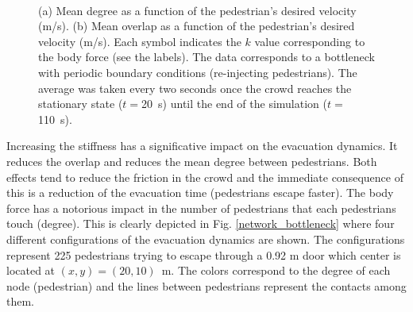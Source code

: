 \documentclass[preprint,12pt]{elsarticle}
\begin{document}
\begin{figure}[!htbp]
\centering
    \ 
    \\
\caption[width=0.47\columnwidth]{(a) Mean degree as a function of the pedestrian’s desired velocity (m/s). (b) Mean overlap as a function of the pedestrian’s desired velocity (m/s). Each symbol indicates the $k$ value corresponding to the body force (see the labels). The data corresponds to a bottleneck with periodic boundary conditions (re-injecting pedestrians). The average was taken every two seconds once the crowd reaches the stationary state ($t=$20~s) until the end of the simulation ($t=$110~s).}
\label{degree_overlap_vd}
\end{figure}


Increasing the stiffness has a significative impact on the evacuation dynamics. It reduces the overlap and reduces the mean degree between pedestrians. Both effects tend to reduce the friction in the crowd and the immediate consequence of this is a reduction of the evacuation time (pedestrians escape faster). The body force has a notorious impact in the number of pedestrians that each pedestrians touch (degree). This is clearly depicted in Fig. \ref{network_bottleneck} where four different configurations of the evacuation dynamics are shown. The configurations represent 225 pedestrians trying to escape through a 0.92 m door which center is located at $(x,y)=(20,10)$~m. The colors correspond to the degree of each node (pedestrian) and the lines between pedestrians represent the contacts among them.\\
\end{document}
